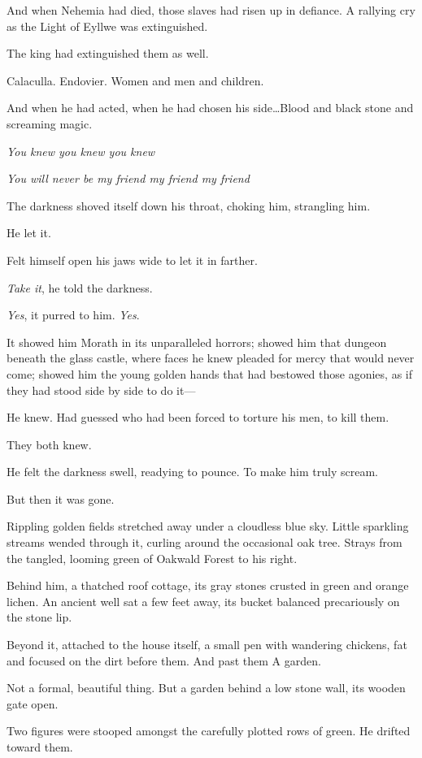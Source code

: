 And when Nehemia had died, those slaves had risen up in defiance.
A rallying cry as the Light of Eyllwe was extinguished.

The king had extinguished them as well.

Calaculla.
Endovier.
Women and men and children.

And when he had acted, when he had chosen his side\ldots Blood and black stone and screaming magic.

\emph{You knew you knew you knew}

\emph{You will never be my friend my friend my friend}

The darkness shoved itself down his throat, choking him, strangling him.

He let it.

Felt himself open his jaws wide to let it in farther.

\emph{Take it}, he told the darkness.

\emph{Yes}, it purred to him.
\emph{Yes}.

It showed him Morath in its unparalleled horrors; showed him that dungeon beneath the glass castle, where faces he knew pleaded for mercy that would never come; showed him the young golden hands that had bestowed those agonies, as if they had stood side by side to do it---

He knew.
Had guessed who had been forced to torture his men, to kill them.

They both knew.

He felt the darkness swell, readying to pounce.
To make him truly scream.

But then it was gone.

Rippling golden fields stretched away under a cloudless blue sky.
Little sparkling streams wended through it, curling around the occasional oak tree.
Strays from the tangled, looming green of Oakwald Forest to his right.

Behind him, a thatched roof cottage, its gray stones crusted in green and orange lichen.
An ancient well sat a few feet away, its bucket balanced precariously on the stone lip.

Beyond it, attached to the house itself, a small pen with wandering chickens, fat and focused on the dirt before them.
And past them  A garden.

Not a formal, beautiful thing.
But a garden behind a low stone wall, its wooden gate open.

Two figures were stooped amongst the carefully plotted rows of green.
He drifted toward them.

